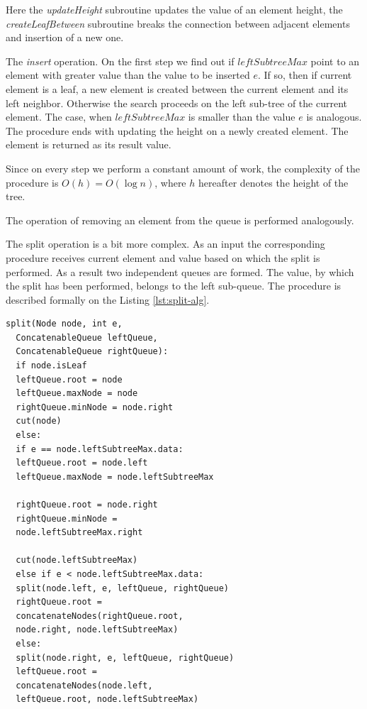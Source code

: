 \documentclass[conference]{IEEEtran}
\theoremstyle{plane}
\begin{document}
		Here the \textit{updateHeight} subroutine updates the value of an element height, the \textit{createLeafBetween} subroutine breaks the connection between adjacent elements and insertion of a new one.
		
		The \textit{insert} operation. On the first step we find out if $leftSubtreeMax$ point to an element with greater value than the value to be inserted $e$. If so, then if current element is a leaf, a new element is created between the current element and its left neighbor. Otherwise the search proceeds on the left sub-tree of the current element. The case, when $leftSubtreeMax$ is smaller than the value $e$ is analogous. The procedure ends with updating the height on a newly created element. The element is returned as its result value.
		
		Since on every step we perform a constant amount of work, the complexity of the procedure is $O(h)=O(\log n)$, where $h$ hereafter denotes the height of the tree.
		
		The operation of removing an element from the queue is performed analogously. 
		
		The split operation is a bit more complex. As an input the corresponding procedure receives current element and value based on which the split is performed. As a result two independent queues are formed. The value, by which the split has been performed, belongs to the left sub-queue. The procedure is described formally on the Listing \ref{lst:split-alg}.
		
		\begin{lstlisting}[caption={Queue plit algorithm},label={lst:split-alg},captionpos=b]
split(Node node, int e, 
  ConcatenableQueue leftQueue, 
  ConcatenableQueue rightQueue): 
  if node.isLeaf
  leftQueue.root = node
  leftQueue.maxNode = node	
  rightQueue.minNode = node.right	
  cut(node)
  else:
  if e == node.leftSubtreeMax.data:
  leftQueue.root = node.left
  leftQueue.maxNode = node.leftSubtreeMax
  	  
  rightQueue.root = node.right
  rightQueue.minNode = 
  node.leftSubtreeMax.right
  	  
  cut(node.leftSubtreeMax)
  else if e < node.leftSubtreeMax.data:
  split(node.left, e, leftQueue, rightQueue)
  rightQueue.root = 
  concatenateNodes(rightQueue.root, 
  node.right, node.leftSubtreeMax)
  else:
  split(node.right, e, leftQueue, rightQueue)
  leftQueue.root = 
  concatenateNodes(node.left, 
  leftQueue.root, node.leftSubtreeMax)
		\end{lstlisting}
		
\end{document}
